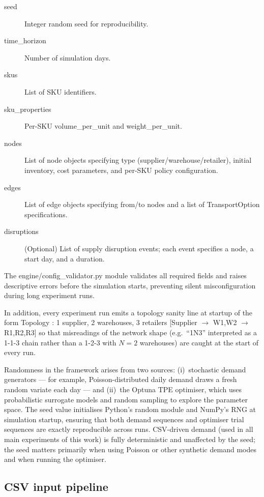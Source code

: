 \begin{description}
  \item[seed] Integer random seed for reproducibility.
  \item[time\_horizon] Number of simulation days.
  \item[skus] List of SKU identifiers.
  \item[sku\_properties] Per-SKU volume\_per\_unit and
        weight\_per\_unit.
  \item[nodes] List of node objects specifying type
        (supplier/warehouse/retailer),
        initial inventory, cost parameters, and per-SKU policy
        configuration.
  \item[edges] List of edge objects specifying from/to nodes and
        a list of TransportOption specifications.
  \item[disruptions] (Optional) List of supply disruption events;
        each event specifies a node, a start day, and a duration.
\end{description}

The engine/config\_validator.py module validates all required fields
and raises descriptive errors before the simulation starts, preventing
silent misconfiguration during long experiment runs.

In addition, every experiment run emits a topology sanity line at startup of
the form
Topology : 1 supplier, 2 warehouses, 3 retailers
[Supplier $\to$ W1,W2 $\to$ R1,R2,R3] so that misreadings of the network
shape (e.g.\ ``1N3'' interpreted as a 1-1-3 chain rather than a 1-2-3 with
$N=2$ warehouses) are caught at the start of every run.

Randomness in the framework arises from two sources: (i)~stochastic demand
generators — for example, Poisson-distributed daily demand draws a fresh
random variate each day — and (ii)~the Optuna TPE optimiser, which uses
probabilistic surrogate models and random sampling to explore the parameter
space.  The seed value initialises Python's random module
and NumPy's RNG at simulation startup, ensuring that both demand sequences
and optimiser trial sequences are exactly reproducible across runs.  CSV-driven
demand (used in all main experiments of this work) is fully deterministic and
unaffected by the seed; the seed matters primarily when using Poisson or
other synthetic demand modes and when running the optimiser.

\subsection{CSV input pipeline}
\label{sec:arch:csv}

